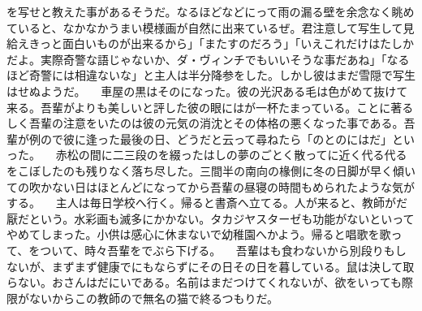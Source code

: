 \documentclass[a5j]{ltjtbook}
\begin{document}
を写せと教えた事があるそうだ。なるほどなどにって雨の漏る壁を余念なく眺めていると、なかなかうまい模様画が自然に出来ているぜ。君注意して写生して見給えきっと面白いものが出来るから」「またすのだろう」「いえこれだけはたしかだよ。実際奇警な語じゃないか、ダ・ヴィンチでもいいそうな事だあね」「なるほど奇警には相違ないな」と主人は半分降参をした。しかし彼はまだ雪隠で写生はせぬようだ。 \newline
　車屋の黒はそのになった。彼の光沢ある毛は色がめて抜けて来る。吾輩がよりも美しいと評した彼の眼にはが一杯たまっている。ことに著るしく吾輩の注意をいたのは彼の元気の消沈とその体格の悪くなった事である。吾輩が例ので彼に逢った最後の日、どうだと云って尋ねたら「のとのにはだ」といった。 \newline
　赤松の間に二三段のを綴ったはしの夢のごとく散ってに近く代る代るをこぼしたのも残りなく落ち尽した。三間半の南向の椽側に冬の日脚が早く傾いての吹かない日はほとんどになってから吾輩の昼寝の時間もめられたような気がする。 \newline
　主人は毎日学校へ行く。帰ると書斎へ立てる。人が来ると、教師がだ厭だという。水彩画も滅多にかかない。タカジヤスターゼも功能がないといってやめてしまった。小供は感心に休まないで幼稚園へかよう。帰ると唱歌を歌って、をついて、時々吾輩をでぶら下げる。 \newline
　吾輩はも食わないから別段りもしないが、まずまず健康でにもならずにその日その日を暮している。鼠は決して取らない。おさんはだにいである。名前はまだつけてくれないが、欲をいっても際限がないからこの教師ので無名の猫で終るつもりだ。 \newline
\newline
\end{document}
